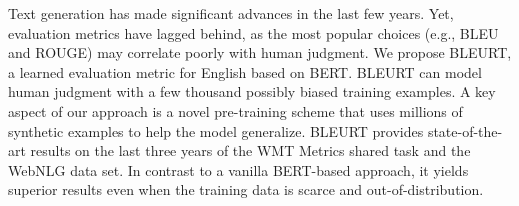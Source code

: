 Text generation has made significant advances in the last few years. Yet, evaluation metrics have lagged behind, as the most popular choices (e.g., BLEU and ROUGE) may correlate poorly with human judgment. We propose BLEURT, a learned evaluation metric for English based on BERT. BLEURT can model human judgment with a few thousand possibly biased training examples. A key aspect of our approach is a novel pre-training scheme that uses millions of synthetic examples to help the model generalize. BLEURT provides state-of-the-art results on the last three years of the WMT Metrics shared task and the WebNLG data set. In contrast to a vanilla BERT-based approach, it yields superior results even when the training data is scarce and out-of-distribution.
